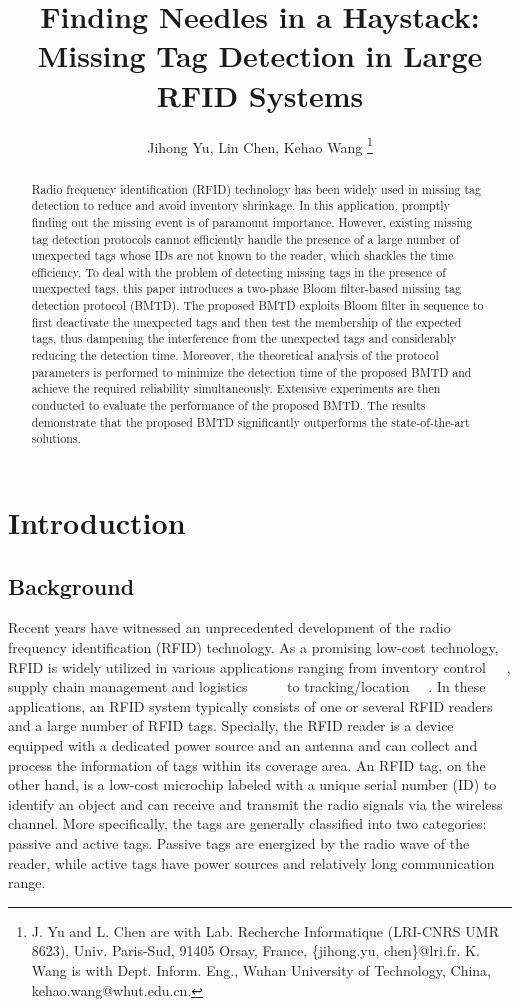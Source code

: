 \documentclass[10pt, twocolumn]{IEEEtran}
\title{Finding Needles in a Haystack: Missing Tag Detection in Large RFID Systems}
\author{Jihong Yu, Lin Chen, Kehao Wang \thanks{J. Yu and L. Chen are with Lab. Recherche Informatique (LRI-CNRS UMR 8623), Univ. Paris-Sud, 91405 Orsay, France, \{jihong.yu, chen\}@lri.fr. K. Wang is with Dept. Inform. Eng., Wuhan University of Technology, China, kehao.wang@whut.edu.cn.}}
\begin{document}
\maketitle

\begin{abstract}
Radio frequency identification (RFID) technology has been widely used in missing tag detection to reduce and avoid inventory shrinkage. In this application, promptly finding out the missing event is of paramount importance. However, existing missing tag detection protocols cannot efficiently handle the presence of a large number of unexpected tags whose IDs are not known to the reader, which shackles the time efficiency. To deal with the problem of detecting missing tags in the presence of unexpected tags, this paper introduces a two-phase Bloom filter-based missing tag detection protocol (BMTD). The proposed BMTD exploits Bloom filter in sequence to first deactivate the unexpected tags and then test the membership of the expected tags, thus dampening the interference from the unexpected tags and considerably reducing the detection time. Moreover, the theoretical analysis of the protocol parameters is performed to minimize the detection time of the proposed BMTD and achieve the required reliability simultaneously. Extensive experiments are then conducted to evaluate the performance of the proposed BMTD. The results demonstrate that the proposed BMTD significantly outperforms the state-of-the-art solutions.

\end{abstract}


\section{Introduction}

\subsection{Background}
Recent years have witnessed an unprecedented development of the radio frequency identification (RFID) technology. As a promising low-cost technology, RFID is widely utilized in various applications ranging from inventory control~\cite{DoD2004}~\cite{DoD2007}~\cite{bu2012misplaced}, supply chain management and logistics~\cite{lee2008supply}~\cite{sheng2008finding}~\cite{chen2011efficient}~\cite{qiao2011polling}~\cite{liu2014query}
to tracking/location \cite{ni2011tracking}~\cite{yang2013localization}~\cite{han2014twins}. In these applications, an RFID system typically consists of one or several RFID readers and a large number of RFID tags. Specially, the RFID reader is a device equipped with a dedicated power source and an antenna and can collect and process the information of tags within its coverage area. An RFID tag, on the other hand, is a low-cost microchip labeled with a unique serial number (ID) to identify an object and can receive and transmit the radio signals via the wireless channel.
More specifically, the tags are generally classified into two categories: passive and active tags. Passive tags are energized by the radio wave of the reader, while active tags have power sources and relatively long communication range.
\end{document}
